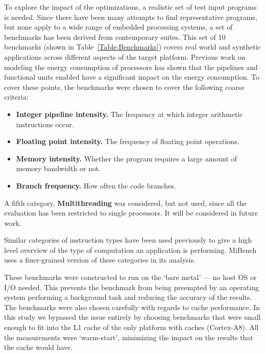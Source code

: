 \documentclass[twocolumn]{article}
\begin{document}
To explore the impact of the optimizations, a realistic set of test input programs is needed. Since there have been many attempts to find representative programs, but none apply to a wide range of embedded processing systems, a set of benchmarks has been derived from contemporary suites. This set of 10 benchmarks (shown in Table~\ref{Table:Benchmarks}) covers real world and synthetic applications across different aspects of the target platform. Previous work on modeling the energy consumption of processors has shown that the pipelines and functional units enabled have a significant impact on the energy consumption. To cover these points, the benchmarks were chosen to cover the following coarse criteria:
\begin{itemize}
	\setlength{\itemsep}{0em}
	\vspace{-1mm}
	\item \textbf{Integer pipeline intensity.} The frequency at which integer arithmetic instructions occur.
	\item \textbf{Floating point intensity.} The frequency of floating point operations.
	\item \textbf{Memory intensity.} Whether the program requires a large amount of memory bandwidth or not.
	\item \textbf{Branch frequency.} How often the code branches.
\end{itemize}

A fifth category, \textbf{Multithreading} was considered, but not used, since all the evaluation has been restricted to single processors. It will be considered in future work.

Similar categories of instruction types have been used previously to give a high level overview of the type of computation an application is performing\cite{Hennessy2012}. MiBench\cite{MiBench} uses a finer-grained version of these categories in its analysis.

These benchmarks were constructed to run on the `bare metal' --- no host OS or I/O needed. This prevents the benchmark from being preempted by an operating system performing a background task and reducing the accuracy of the results. The benchmarks were also chosen carefully with regards to cache performance. In this study we bypassed the issue entirely by choosing benchmarks that were small enough to fit into the L1 cache of the only platform with caches (Cortex-A8). All the measurements were `warm-start', minimizing the impact on the results that the cache would have.
\end{document}
